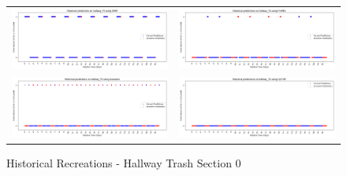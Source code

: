 \begin{figure}
  \begin{tabular}{cc}
    {\includegraphics[width = 3in]{images/results/Historical_hallway_T0_DMM.png}} &
    {\includegraphics[width = 3in]{images/results/Historical_hallway_T0_FreMEn.png}} \\
    {\includegraphics[width = 3in]{images/results/Historical_hallway_T0_Gaussian.png}} &
    {\includegraphics[width = 3in]{images/results/Historical_hallway_T0_HyT-EM.png}} \\
  \end{tabular}
  \caption{Historical Recreations - Hallway Trash Section 0}
\end{figure}

